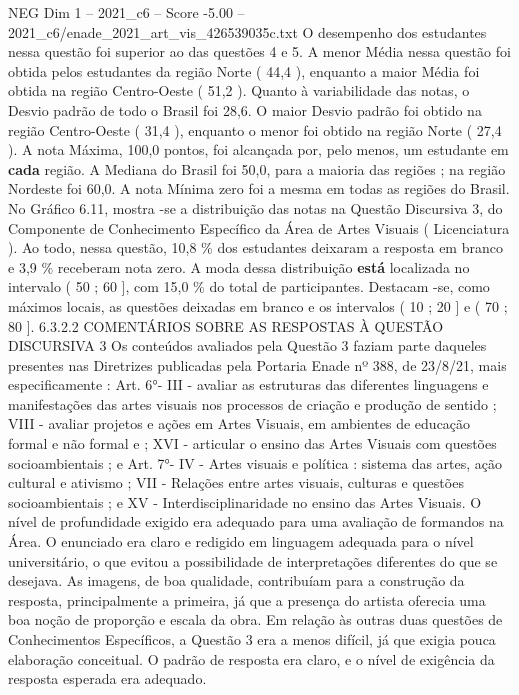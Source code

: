 \begin{textsample}{NEG Dim 1 – 2021\_c6 – Score -5.00 – 2021\_c6/enade\_2021\_art\_vis\_426539035c.txt}
O desempenho dos estudantes nessa questão foi superior ao das questões 4 e 5.
A menor Média nessa questão foi obtida pelos estudantes da região Norte ( 44,4 ), enquanto a maior Média foi obtida na região Centro-Oeste ( 51,2 ).
Quanto à variabilidade das notas, o Desvio padrão de todo o Brasil foi 28,6.
O maior Desvio padrão foi obtido na região Centro-Oeste ( 31,4 ), enquanto o menor foi obtido na região Norte ( 27,4 ).
A nota Máxima, 100,0 pontos, foi alcançada por, pelo menos, um estudante em \textbf{cada} região.
A Mediana do Brasil foi 50,0, para a maioria das regiões ; na região Nordeste foi 60,0.
A nota Mínima zero foi a mesma em todas as regiões do Brasil.
No Gráfico 6.11, mostra -se a distribuição das notas na Questão Discursiva 3, do Componente de Conhecimento Específico da Área de Artes Visuais ( Licenciatura ).
Ao todo, nessa questão, 10,8 \% dos estudantes deixaram a resposta em branco e 3,9 \% receberam nota zero.
A moda dessa distribuição \textbf{está} localizada no intervalo ( 50 ; 60 ], com 15,0 \% do total de participantes.
Destacam -se, como máximos locais, as questões deixadas em branco e os intervalos ( 10 ; 20 ] e ( 70 ; 80 ]. 6.3.2.2 COMENTÁRIOS SOBRE AS RESPOSTAS À QUESTÃO DISCURSIVA 3 Os conteúdos avaliados pela Questão 3 faziam parte daqueles presentes nas Diretrizes publicadas pela Portaria Enade nº 388, de 23/8/21, mais especificamente : Art. 6{\EmojiFont °}- III - avaliar as estruturas das diferentes linguagens e manifestações das artes visuais nos processos de criação e produção de sentido ; VIII - avaliar projetos e ações em Artes Visuais, em ambientes de educação formal e não formal e ; XVI - articular o ensino das Artes Visuais com questões socioambientais ; e Art. 7{\EmojiFont °}- IV - Artes visuais e política : sistema das artes, ação cultural e ativismo ; VII - Relações entre artes visuais, culturas e questões socioambientais ; e XV - Interdisciplinaridade no ensino das Artes Visuais.
O nível de profundidade exigido era adequado para uma avaliação de formandos na Área.
O enunciado era claro e redigido em linguagem adequada para o nível universitário, o que evitou a possibilidade de interpretações diferentes do que se desejava.
As imagens, de boa qualidade, contribuíam para a construção da resposta, principalmente a primeira, já que a presença do artista oferecia uma boa noção de proporção e escala da obra.
Em relação às outras duas questões de Conhecimentos Específicos, a Questão 3 era a menos difícil, já que exigia pouca elaboração conceitual.
O padrão de resposta era claro, e o nível de exigência da resposta esperada era adequado.

\end{textsample}
